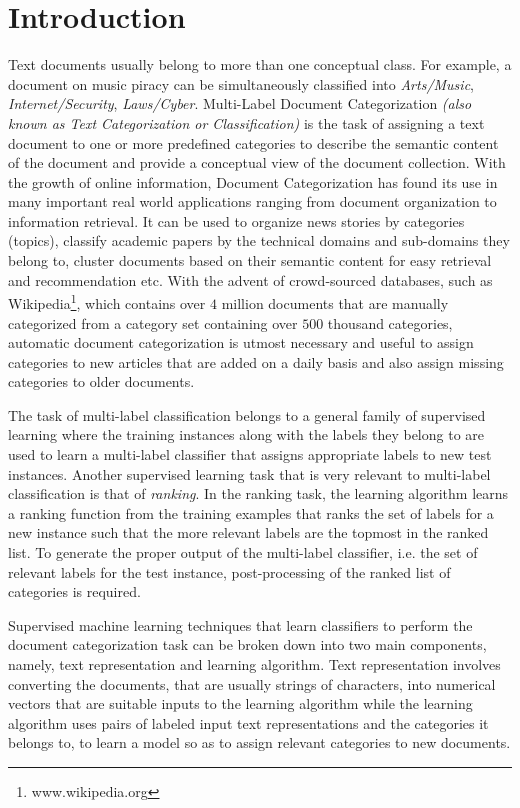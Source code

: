 \chapter{Introduction}
\label{chapter:introduction}

Text documents usually belong to more than one conceptual class. For example, a document on music piracy can be simultaneously classified into \emph{Arts/Music}, \emph{Internet/Security}, \emph{Laws/Cyber}.     Multi-Label Document Categorization \emph{(also known as Text Categorization or Classification)} is the task of assigning a text document to one or more predefined categories to describe the semantic content of the document and provide a conceptual view of the document collection.
With the growth of online information, Document Categorization has found its use in many important real world applications ranging from document organization to information retrieval. It can be used to organize news stories by categories (topics), classify academic papers by the technical domains and sub-domains they belong to, cluster documents based on their semantic content for easy retrieval and recommendation etc.
With the advent of crowd-sourced databases, such as Wikipedia\footnote{www.wikipedia.org}, which contains over $4$ million documents that are manually categorized from a category set containing over $500$ thousand categories, automatic document categorization is utmost necessary and useful to assign categories to new articles that are added on a daily basis and also assign missing categories to older documents.

The task of multi-label classification belongs to a general family of supervised learning where the training instances along with the labels they belong to are used to learn a multi-label classifier that assigns appropriate labels to new test instances. 
Another supervised learning task that is very relevant to multi-label classification is that of \emph{ranking}. In the ranking task, the learning algorithm learns a ranking function from the training examples that ranks the set of labels for a new instance such that the more relevant labels are the topmost in the ranked list. 
To generate the proper output of the multi-label classifier, i.e. the set of relevant labels for the test instance, post-processing of the ranked list of categories is required.

Supervised machine learning techniques that learn classifiers to perform the document categorization task can be broken down into two main components, namely, text representation and learning algorithm. 
Text representation involves converting the documents, that are usually strings of characters, into numerical vectors that are suitable inputs to the learning algorithm while the learning algorithm uses pairs of labeled input text representations and the categories it belongs to, to learn a model so as to assign relevant categories to new documents. 

